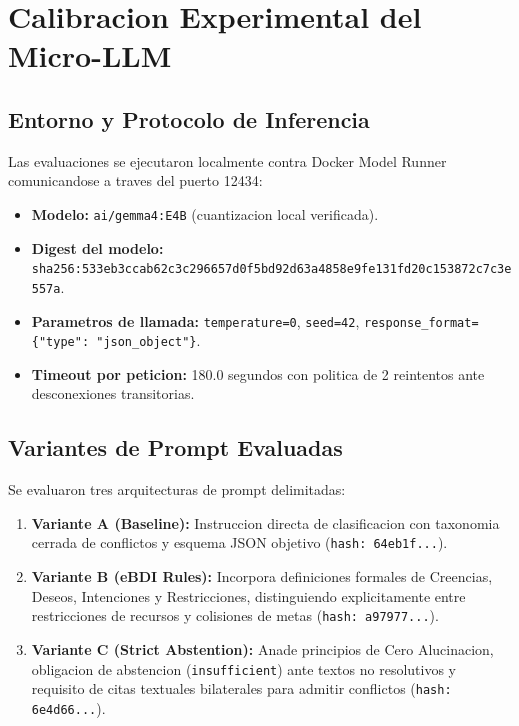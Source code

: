 \documentclass[11pt,a4paper]{article}
\begin{document}
\section{Calibracion Experimental del Micro-LLM}

\subsection{Entorno y Protocolo de Inferencia}
Las evaluaciones se ejecutaron localmente contra Docker Model Runner comunicandose a traves del puerto 12434:
\begin{itemize}[itemsep=2pt]
    \item \textbf{Modelo:} \texttt{ai/gemma4:E4B} (cuantizacion local verificada).
    \item \textbf{Digest del modelo:} \texttt{sha256:533eb3ccab62c3c296657d0f5bd92d63a4858e9fe131fd20c153872c7c3e557a}.
    \item \textbf{Parametros de llamada:} \texttt{temperature=0}, \texttt{seed=42}, \texttt{response\_format=\{"type": "json\_object"\}}.
    \item \textbf{Timeout por peticion:} 180.0 segundos con politica de 2 reintentos ante desconexiones transitorias.
\end{itemize}

\subsection{Variantes de Prompt Evaluadas}
Se evaluaron tres arquitecturas de prompt delimitadas:
\begin{enumerate}[itemsep=2pt]
    \item \textbf{Variante A (Baseline):} Instruccion directa de clasificacion con taxonomia cerrada de conflictos y esquema JSON objetivo (\texttt{hash: 64eb1f...}).
    \item \textbf{Variante B (eBDI Rules):} Incorpora definiciones formales de Creencias, Deseos, Intenciones y Restricciones, distinguiendo explicitamente entre restricciones de recursos y colisiones de metas (\texttt{hash: a97977...}).
    \item \textbf{Variante C (Strict Abstention):} Anade principios de Cero Alucinacion, obligacion de abstencion (\texttt{insufficient}) ante textos no resolutivos y requisito de citas textuales bilaterales para admitir conflictos (\texttt{hash: 6e4d66...}).
\end{enumerate}
\end{document}
